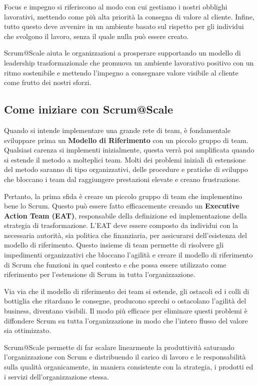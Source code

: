 \documentclass[12pt,a4paper,parskip=full]{scrartcl}
\begin{document}
Focus e impegno si riferiscono al modo con cui gestiamo i nostri obblighi lavorativi, mettendo come più alta priorità la consegna di valore al cliente. Infine, tutto questo deve avvenire in un ambiente basato sul rispetto per gli individui che svolgono il lavoro, senza il quale nulla può essere creato.

Scrum@Scale aiuta le organizzazioni a prosperare supportando un modello di leadership trasformazionale che promuova un ambiente lavorativo positivo con un ritmo sostenibile e mettendo l'impegno a consegnare valore visibile al cliente come frutto dei nostri sforzi.

\subsection{Come iniziare con Scrum@Scale}
Quando si intende implementare una grande rete di team, è fondamentale sviluppare prima un \textbf{Modello di Riferimento} con un piccolo gruppo di team. Qualsiasi carenza si implementi inizialmente, questa verrà poi amplificata quando si estende il metodo a molteplici team. Molti dei problemi iniziali di estensione del metodo saranno di tipo organizzativi, delle procedure e pratiche di sviluppo che bloccano i team dal raggiungere prestazioni elevate e creano frustrazione.

Pertanto, la prima sfida è creare un piccolo gruppo di team che implementino bene lo Scrum. Questo può essere fatto efficacemente creando un \textbf{Executive Action Team (EAT)}, responsabile della definizione ed implementazione della strategia di trasformazione. L'EAT deve essere composto da individui con la necessaria autorità, sia politica che finanziaria, per assicurarsi dell'esistenza del modello di riferimento. Questo insieme di team permette di risolvere gli impedimenti organizzativi che bloccano l'agilità e creare il modello di riferimento di Scrum che funzioni in quel contesto e che possa essere utilizzato come riferimento per l'estensione di Scrum in tutta l'organizzazione.

Via via che il modello di riferimento dei team si estende, gli ostacoli ed i colli di bottiglia che ritardano le consegne, producono sprechi o ostacolano l'agilità del business,  diventano visibili. Il modo più efficace per eliminare questi problemi è diffondere Scrum su tutta l'organizzazione in modo che l'intero flusso del valore sia ottimizzato.

Scrum@Scale permette di far scalare linearmente la produttività saturando l'organizzazione con Scrum e distribuendo il carico di lavoro e le responsabilità sulla qualità organicamente, in maniera consistente con la strategia, i prodotti ed i servizi dell'organizzazione stessa.
\end{document}
